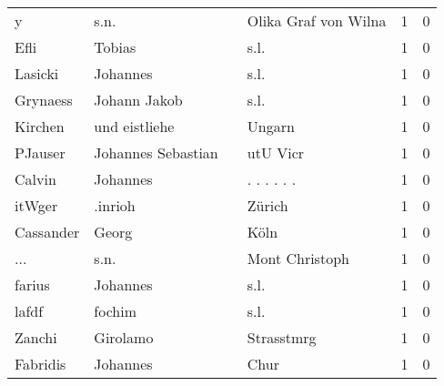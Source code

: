 \begin{center}
\begin{tiny}
\begin{longtabu}{llllrr}
                        y &                               s.n. &             &                        Olika Graf von Wilna &          1 &         0 \\
                     Efli &                             Tobias &             &                                        s.l. &          1 &         0 \\
                  Lasicki &                           Johannes &             &                                        s.l. &          1 &         0 \\
                 Grynaess &                       Johann Jakob &             &                                        s.l. &          1 &         0 \\
                  Kirchen &                      und eistliehe &             &                                      Ungarn &          1 &         0 \\
                  PJauser &                 Johannes Sebastian &             &                                    utU Vicr &          1 &         0 \\
                   Calvin &                           Johannes &             &                                . . . . . .  &          1 &         0 \\
                   itWger &                            .inrioh &             &                                      Zürich &          1 &         0 \\
                Cassander &                              Georg &             &                                        Köln &          1 &         0 \\
                      ... &                               s.n. &             &                              Mont Christoph &          1 &         0 \\
                   farius &                           Johannes &             &                                        s.l. &          1 &         0 \\
                    lafdf &                             fochim &             &                                        s.l. &          1 &         0 \\
                   Zanchi &                           Girolamo &             &                                  Strasstmrg &          1 &         0 \\
                 Fabridis &                           Johannes &             &                                        Chur &          1 &         0 \\

\end{longtabu}
\end{tiny}
\end{center}
